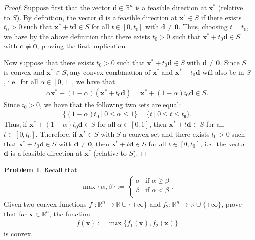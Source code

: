 \documentclass[12pt]{article}
\theoremstyle{definition}
\newtheorem{problem}{Problem}
\newcommand{\vc}[1]{\boldsymbol{#1}}
\begin{document}
\begin{proof}
  Suppose first that the vector $\vc{d} \in \mathbb{R}^n$ is a feasible
  direction at $\vc{x}^*$ (relative to $S$). By definition, the vector
  $\vc{d}$ is a feasible direction at $\vc{x}^*\in S$ if there exists
  $t_0 > 0$ such that $\vc{x}^* + t \vc{d} \in S$ for all $t \in [0, t_0]$
  with $\vc{d} \neq \vc{0}$. Thus, choosing $t=t_0$, we have by the above definition that there
  exists $t_0 > 0$ such that $\vc{x}^* + t_0\vc{d} \in S$ with $\vc{d} \neq \vc{0}$, proving the first implication.

  Now suppose that there exists $t_0 > 0$ such that $\vc{x}^* + t_0 \vc{d} \in S$
  with $\vc{d} \neq \vc{0}$. Since $S$ is convex and $\vc{x}^* \in S$, any convex combination
  of $\vc{x}^*$ and $\vc{x}^* + t_0 \vc{d}$ will also be in $S$, i.e.\ for all
  $\alpha \in [0, 1]$, we have that
  \begin{align*}
    \alpha \vc{x}^* + (1-\alpha)(\vc{x}^* + t_0 \vc{d}) = \vc{x}^* + (1-\alpha)t_0 \vc{d} \in S.
  \end{align*}
  Since $t_0 > 0$, we have that the following two sets are equal:
  \begin{align*}
    \{(1-\alpha)t_0 \ | \ 0 \leq \alpha \leq 1\} = \{ t \ |\ 0 \leq t \leq t_0\}.
  \end{align*}
  Thus, if $\vc{x}^* + (1-\alpha)t_0 \vc{d} \in S$ for all $\alpha \in [0, 1]$, then
  $\vc{x}^* + t \vc{d} \in S$ for all $t \in [0, t_0]$. Therefore, if
  $\vc{x}^* \in S$ with $S$ a convex set and there exists $t_0 > 0$ such that
  $\vc{x}^* + t_0 \vc{d} \in S$ with $\vc{d} \neq \vc{0}$, then
  $\vc{x}^* + t \vc{d} \in S$ for all $t \in [0, t_0]$, i.e.\
  the vector $\vc{d}$ is a feasible direction at $\vc{x}^*$ (relative to $S$).
\end{proof}
\newpage


\begin{problem}
  Recall that
  \begin{align*}
    \max\{\alpha, \beta\} :=
    \begin{cases}
      \alpha & \text{if $\alpha \geq \beta$} \\
      \beta & \text{if $\alpha < \beta$} \\
    \end{cases}.
  \end{align*}
  Given two convex functions $f_1: \mathbb{R}^n \to \mathbb{R} \cup \{+\infty\}$
  and $f_2: \mathbb{R}^n \to \mathbb{R} \cup \{+\infty\}$, prove that for
  $\vc{x} \in \mathbb{R}^n$, the function
  \begin{align*}
    f(\vc{x}) := \max\{f_1(\vc{x}), f_2(\vc{x})\}
  \end{align*}
  is convex.
\end{problem}
\end{document}
